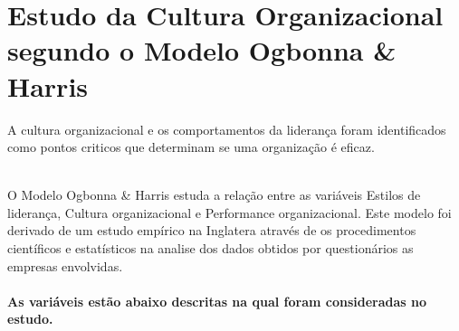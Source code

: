 \newpage
\section{Estudo da Cultura Organizacional segundo o Modelo Ogbonna \& Harris}

A cultura organizacional e os comportamentos da liderança foram identificados como pontos criticos que determinam se uma organização é eficaz.\\

\\
O Modelo Ogbonna \& Harris estuda a relação entre as variáveis Estilos de liderança, Cultura organizacional e Performance organizacional. Este modelo foi derivado de um estudo empírico na Inglatera através de os procedimentos científicos e estatísticos na analise dos dados obtidos por questionários as empresas envolvidas.\\
\\
{\bf As variáveis estão abaixo descritas na qual foram consideradas no estudo.}\\
\\

